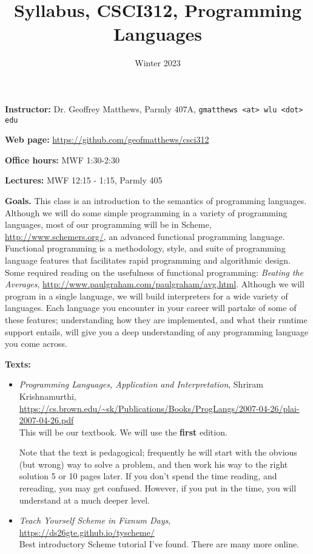 \documentclass{article}
\title{
Syllabus, CSCI312, Programming Languages
}
\author{Winter 2023}
\date{}
\newcommand{\myitem}[1]{\item{\bf #1}}
\begin{document}
\maketitle

\begin{description}

\myitem{Instructor:}
Dr. Geoffrey Matthews,
Parmly 407A, {\tt gmatthews <at>  wlu <dot> edu}

\myitem{Web page:} \url{https://github.com/geofmatthews/csci312} 

\myitem{Office hours:} MWF 1:30-2:30

\myitem{Lectures:} MWF 12:15 - 1:15, Parmly 405

\myitem{Goals.}  This class is an introduction to the semantics of
programming languages.  Although we will do some simple programming in
a variety of programming languages, most of our programming will be in
Scheme, \url{http://www.schemers.org/}, an advanced functional
programming language.  Functional programming is a methodology, style,
and suite of programming language features that facilitates rapid
programming and algorithmic design.  Some required reading on the
usefulness of functional programming: {\em Beating the Averages},
\url{http://www.paulgraham.com/paulgraham/avg.html}.  Although we will
program in a single language, we will build interpreters for a wide
variety of languages.  Each language you encounter in your career will
partake of some of these features; understanding how they are
implemented, and what their runtime support entails, will give you a
deep understanding of any programming language you come across.


\myitem{Texts:}
\begin{itemize}
\item {\em Programming Languages, Application and Interpretation},
  Shriram Krishnamurthi,\\
\url{https://cs.brown.edu/~sk/Publications/Books/ProgLangs/2007-04-26/plai-2007-04-26.pdf}\\
This will be our textbook.  We will use the {\bf first} edition.

Note that the text is pedagogical; frequently he will start
with the obvious (but wrong) way to solve a problem, and then work his
way to the right solution 5 or 10 pages later.  If you don't spend the
time reading, and rereading, you may get confused.  However, if you
put in the time, you will understand at a much deeper level.


\item {\em Teach Yourself Scheme in Fixnum Days}, \\
\url{https://ds26gte.github.io/tyscheme/}\\
Best introductory Scheme tutorial I've found.  There are many
more online.


\end{itemize}
\end{description}
\end{document}
